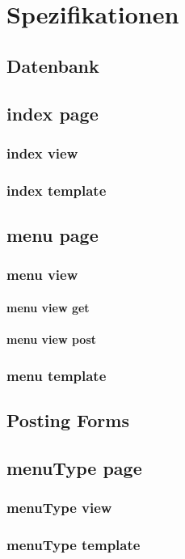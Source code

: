 \chapter{Spezifikationen}
\section{Datenbank}

\section{index page}
\subsection{index view}
\subsection{index template}

\section{menu page}
\subsection{menu view}
\subsubsection{menu view get}
\subsubsection{menu view post}
\subsection{menu template}

\section{Posting Forms}

\section{menuType page}
\subsection{menuType view}
\subsection{menuType template}

